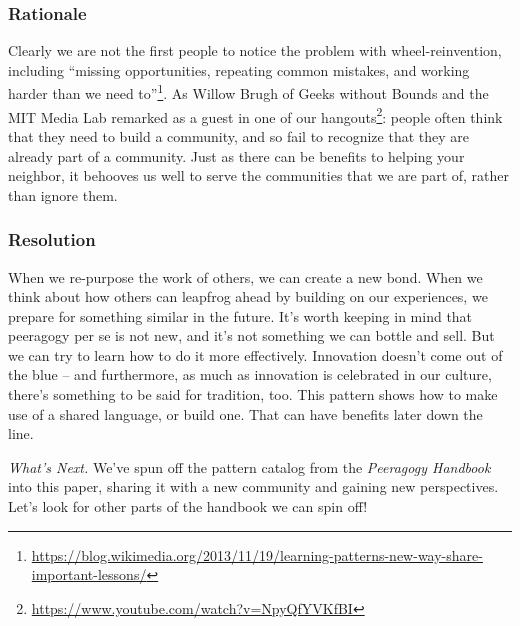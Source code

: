 \subsubsection*{Rationale} 
Clearly we are not the first people to notice the problem with wheel-reinvention, including ``missing opportunities, repeating common mistakes, and working harder than we need to''\footnote{\url{https://blog.wikimedia.org/2013/11/19/learning-patterns-new-way-share-important-lessons/}}.  As Willow Brugh of Geeks without Bounds and the MIT Media Lab remarked as a guest in one of our hangouts\footnote{\url{https://www.youtube.com/watch?v=NpyQfYVKfBI}}: people often think that they need to build a community, and so fail to recognize that they are already part of a community.  Just as there can be benefits to helping your neighbor, it behooves us well to serve the communities that we are part of, rather than ignore them.  

\subsubsection*{Resolution} When we re-purpose the work of others, we can create a new bond.   When we think about how others can leapfrog ahead by building on our experiences, we prepare for something similar in the future.  It's worth keeping in mind that peeragogy per se is not new, and it's not something we can bottle and sell.  But we can try to learn how to do it more effectively.  Innovation doesn't come out of the blue -- and furthermore, as much as innovation is celebrated in our culture, there's something to be said for tradition, too.   This pattern shows how to make use of a shared language, or build one.  That can have benefits later down the line.

\begin{framed}
\emph{What's Next.}
We've spun off the pattern catalog from the \emph{Peeragogy Handbook} into this paper, sharing it with a new community and gaining new perspectives.  Let's look for other parts of the handbook we can spin off!
\end{framed}

\endgroup
    
    
    
    
    
    
    
    
    
    
    
    
    
    
    